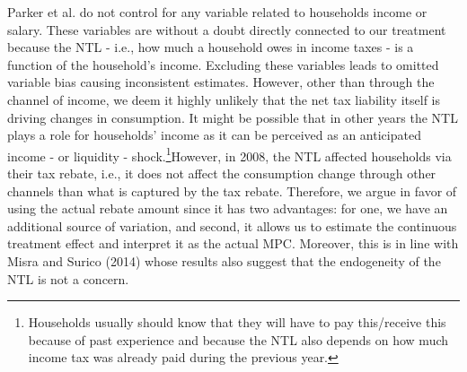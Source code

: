 Parker et al. do not control for any variable related to households income or salary. These variables are without a doubt directly connected to our treatment because the NTL - i.e., how much a household owes in income taxes - is a function of the household's income. Excluding these variables leads to omitted variable bias causing inconsistent estimates. However, other than through the channel of income, we deem it highly unlikely that the net tax liability itself is driving changes in consumption. It might be possible that in other years the NTL plays a role for households' income as it can be perceived as an anticipated income - or liquidity - shock.\footnote{Households usually should know that they will have to pay this/receive this because of past experience and because the NTL also depends on how much income tax was already paid during the previous year.}However, in 2008, the NTL affected households via their tax rebate, i.e., it does not affect the consumption change through other channels than what is captured by the tax rebate. Therefore, we argue in favor of using the actual rebate amount since it has two advantages: for one, we have an additional source of variation, and second, it allows us to estimate the continuous treatment effect and interpret it as the actual MPC. Moreover, this is in line with Misra and Surico (2014) whose results also suggest that the endogeneity of the NTL is not a concern.

